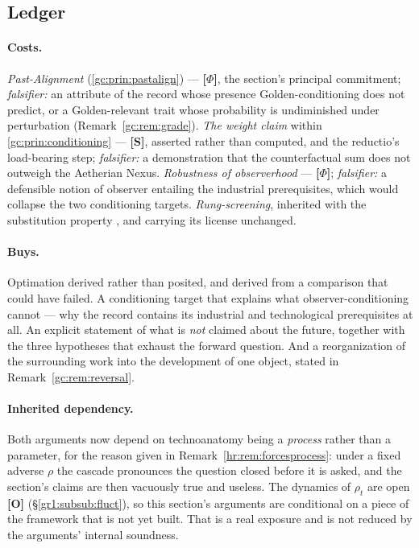 \documentclass[11pt]{article}
\numberwithin{equation}{section}
\theoremstyle{plain}
\theoremstyle{definition}
\theoremstyle{remark}
\begin{document}
\subsection{Ledger}\label{gc:sub:ledger}

\paragraph{Costs.} \emph{Past-Alignment} (\ref{gc:prin:pastalign}) ---
\textbf{[$\Phi$]}, the section's principal commitment;
\emph{falsifier:} an attribute of the record whose presence
Golden-conditioning does not predict, or a Golden-relevant trait whose
probability is undiminished under perturbation
(Remark~\ref{gc:rem:grade}). \emph{The weight claim} within
\ref{gc:prin:conditioning} --- \textbf{[S]}, asserted rather than
computed, and the reductio's load-bearing step;
\emph{falsifier:} a demonstration that the counterfactual sum does not
outweigh the Aetherian Nexus. \emph{Robustness of observerhood} ---
\textbf{[$\Phi$]}; \emph{falsifier:} a defensible notion of observer
entailing the industrial prerequisites, which would collapse the two
conditioning targets. \emph{Rung-screening}, inherited with the
substitution property \cite{Ben26Optimal}, and carrying its license
unchanged.

\paragraph{Buys.} Optimation derived rather than posited, and derived
from a comparison that could have failed. A conditioning target that
explains what observer-conditioning cannot --- why the record contains
its industrial and technological prerequisites at all. An explicit
statement of what is \emph{not} claimed about the future, together with
the three hypotheses that exhaust the forward question. And a
reorganization of the surrounding work into the development of one
object, stated in Remark~\ref{gc:rem:reversal}.

\paragraph{Inherited dependency.} Both arguments now depend on
technoanatomy being a \emph{process} rather than a parameter, for the
reason given in Remark~\ref{hr:rem:forcesprocess}: under a fixed
adverse $\rho$ the cascade pronounces the question closed before it is
asked, and the section's claims are then vacuously true and useless.
The dynamics of $\rho_t$ are open \textbf{[O]}
(\S\ref{gr1:subsub:fluct}), so this section's arguments are conditional
on a piece of the framework that is not yet built. That is a real
exposure and is not reduced by the arguments' internal soundness.
\end{document}
